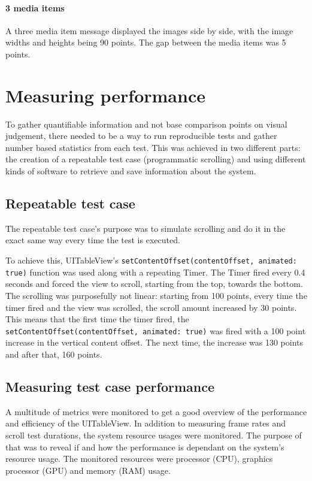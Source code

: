 \documentclass[a4paper,12pt]{article}
\begin{document}
\paragraph*{3 media items}
A three media item message displayed the images side by side, with the image widths and heights being 90 points. The gap between the media items was 5 points.

\newpage
\section{Measuring performance}
To gather quantifiable information and not base comparison points on visual judgement, there needed to be a way to run reproducible tests and gather number based statistics from each test. This was achieved in two different parts: the creation of a repeatable test case (programmatic scrolling) and using different kinds of software to retrieve and save information about the system.

\subsection{Repeatable test case}
The repeatable test case's purpose was to simulate scrolling and do it in the exact same way every time the test is executed.

To achieve this, UITableView's \texttt{setContentOffset(contentOffset, animated: true)} function was used along with a repeating Timer. The Timer fired every 0.4 seconds and forced the view to scroll, starting from the top, towards the bottom. The scrolling was purposefully not linear: starting from 100 points, every time the timer fired and the view was scrolled, the scroll amount increased by 30 points. This means that the first time the timer fired, the \texttt{setContentOffset(contentOffset, animated: true)} was fired with a 100 point increase in the vertical content offset. The next time, the increase was 130 points and after that, 160 points.

\subsection{Measuring test case performance}
A multitude of metrics were monitored to get a good overview of the performance and efficiency of the UITableView. In addition to measuring frame rates and scroll test durations, the system resource usages were monitored. The purpose of that was to reveal if and how the performance is dependant on the system's resource usage. The monitored resources were processor (CPU), graphics processor (GPU) and memory (RAM) usage.
\end{document}
